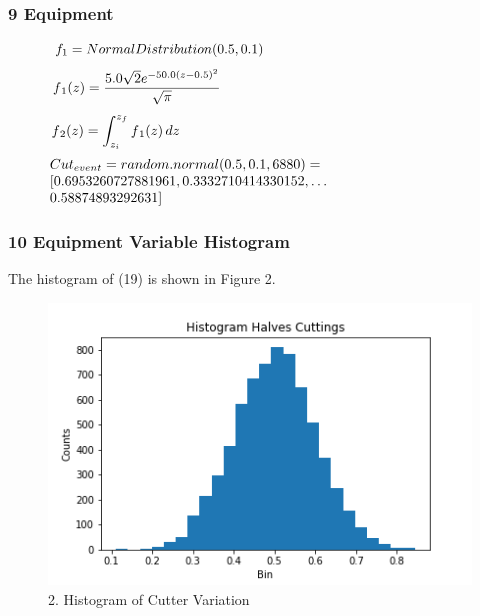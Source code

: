 \documentclass[11pt]{beamer}
\begin{document}
\begin{frame}
\frametitle{9 Equipment}
\begin{equation}
\begin{minipage}{300pt}
 $\displaystyle f_{1} = NormalDistribution(0.5, 0.1)$  
\end{minipage}
\end{equation}
\begin{equation}
\begin{minipage}{300pt}
 $\displaystyle f{_1}(z) = \frac{5.0 \sqrt{2} e^{- 50.0 \left(z - 0.5\right)^{2}}}{\sqrt{\pi}}$  
\end{minipage}
\end{equation}
\begin{equation}
\begin{minipage}{300pt}
 $\displaystyle f{_2}(z) = \int_{z_{i}}^{z_{f}} f{_1}(z)\, dz$  
\end{minipage}
\end{equation}
\begin{equation}
\begin{minipage}{300pt}
 $\displaystyle Cut_{event} = random.normal(0.5, 0.1, 6880) =  \newline  [0.6953260727881961, 0.3332710414330152, \dots \\ 0.58874893292631] $  
\end{minipage}
\end{equation}

\end{frame}

\begin{frame}
\frametitle{10 Equipment Variable Histogram}
\noindent The histogram of (19) is shown in Figure 2.
\begin{figure}[H]
\centering\includegraphics[width=1\linewidth,height=0.7\textheight]{Fig02}
\caption{2. Histogram of Cutter Variation}
\label{fig:Fig02}
\end{figure}


\end{frame}
\end{document}

